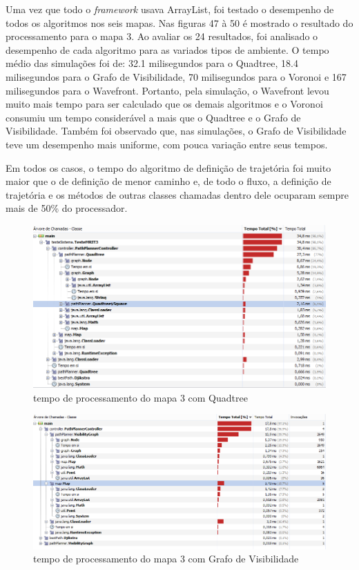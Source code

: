 Uma vez que todo o \textit{framework} usava ArrayList, foi testado o desempenho de todos os algoritmos nos seis mapas. Nas figuras 47 à 50 é mostrado o resultado do processamento para o mapa 3. Ao avaliar os 24 resultados, foi analisado o desempenho de cada algoritmo para as variados tipos de ambiente. O tempo médio das simulações foi de: 32.1 milisegundos para o Quadtree, 18.4 milisegundos para o Grafo de Visibilidade, 70 milisegundos para o Voronoi e 167 milisegundos para o Wavefront. Portanto, pela simulação, o Wavefront levou muito mais tempo para ser calculado que os demais algoritmos e o Voronoi consumiu um tempo considerável a mais que o Quadtree e o Grafo de Visibilidade. Também foi observado que, nas simulações, o Grafo de Visibilidade teve um desempenho mais uniforme, com pouca variação entre seus tempos.

Em todos os casos, o tempo do algoritmo de definição de trajetória foi muito maior que o de definição de menor caminho e, de todo o fluxo, a definição de trajetória e os métodos de outras classes chamadas dentro dele ocuparam sempre mais de 50\% do processador.

\begin{figure}[h]
	\centering
	\label{fig47}
		\includegraphics[keepaspectratio=true,scale=0.6]{figuras/quad3.PNG}
	\caption{tempo de processamento do mapa 3 com Quadtree}
\end{figure}

\begin{figure}[h]
	\centering
	\label{fig48}
		\includegraphics[keepaspectratio=true,scale=0.6]{figuras/visib3.PNG}
	\caption{tempo de processamento do mapa 3 com Grafo de Visibilidade}
\end{figure}

